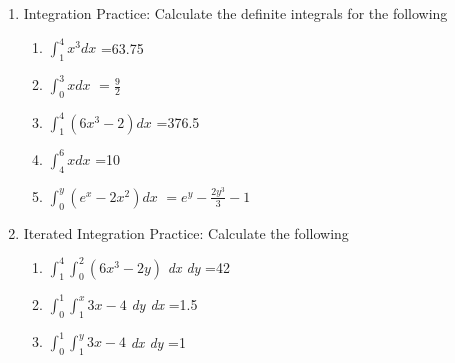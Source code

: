 \documentclass[11pt]{article}
\begin{document}
\begin{enumerate}
\item Integration Practice: Calculate the definite integrals for the following
\begin{enumerate}
\item $\int_1^4 x^3 dx${\color{gray}  =63.75}
\item $\int_0^3 x dx${\color{gray}  $=\frac{9}{2}$}
\item $\int_1^4 (6x^3-2) dx${\color{gray}  =376.5}
\item $\int_4^6 x dx${\color{gray}  =10}
\item $\int_0^y (e^x-2x^2)dx${\color{gray}  $=e^y-\frac{2y^3}{3}-1$ }
\end{enumerate}


\item Iterated Integration Practice: Calculate the  following
\begin{enumerate}
\item $\int_1^4  \int_0^2 (6x^3-2y)$ \textit{dx dy} {\color{gray} =42}
\item $\int_0^1 \int_1^x 3x-4$ \textit{dy dx} {\color{gray} =1.5}
\item $\int_0^1 \int_1^y 3x-4$ \textit{dx dy} {\color{gray} =1}
\end{enumerate}
\end{enumerate}
\end{document}
